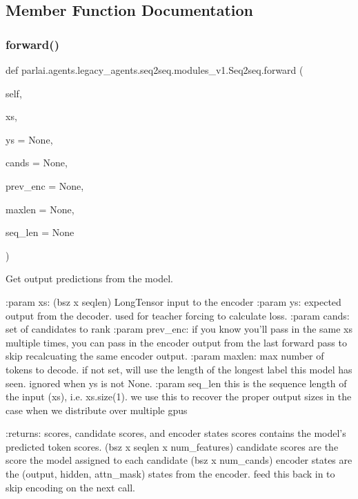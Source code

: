 \subsection{Member Function Documentation}
\mbox{\label{classparlai_1_1agents_1_1legacy__agents_1_1seq2seq_1_1modules__v1_1_1Seq2seq_a59af567499dfa8e60ccc185391143d41}} 
\subsubsection{\texorpdfstring{forward()}{forward()}}
{\footnotesize\ttfamily def parlai.\+agents.\+legacy\+\_\+agents.\+seq2seq.\+modules\+\_\+v1.\+Seq2seq.\+forward (\begin{DoxyParamCaption}\item[{}]{self,  }\item[{}]{xs,  }\item[{}]{ys = {\ttfamily None},  }\item[{}]{cands = {\ttfamily None},  }\item[{}]{prev\+\_\+enc = {\ttfamily None},  }\item[{}]{maxlen = {\ttfamily None},  }\item[{}]{seq\+\_\+len = {\ttfamily None} }\end{DoxyParamCaption})}

\begin{DoxyVerb}Get output predictions from the model.

:param xs:          (bsz x seqlen) LongTensor input to the encoder
:param ys:          expected output from the decoder. used for teacher
            forcing to calculate loss.
:param cands:       set of candidates to rank
:param prev_enc:    if you know you'll pass in the same xs multiple
            times, you can pass in the encoder output from the
            last forward pass to skip recalcuating the same
            encoder output.
:param maxlen:      max number of tokens to decode. if not set, will
            use the length of the longest label this model
            has seen. ignored when ys is not None.
:param seq_len      this is the sequence length of the input (xs), i.e.
            xs.size(1). we use this to recover the proper
            output sizes in the case when we distribute over
            multiple gpus

:returns: scores, candidate scores, and encoder states
    scores contains the model's predicted token scores.
(bsz x seqlen x num_features)
    candidate scores are the score the model assigned to each candidate
(bsz x num_cands)
    encoder states are the (output, hidden, attn_mask) states from the
encoder. feed this back in to skip encoding on the next call.
\end{DoxyVerb}
 

